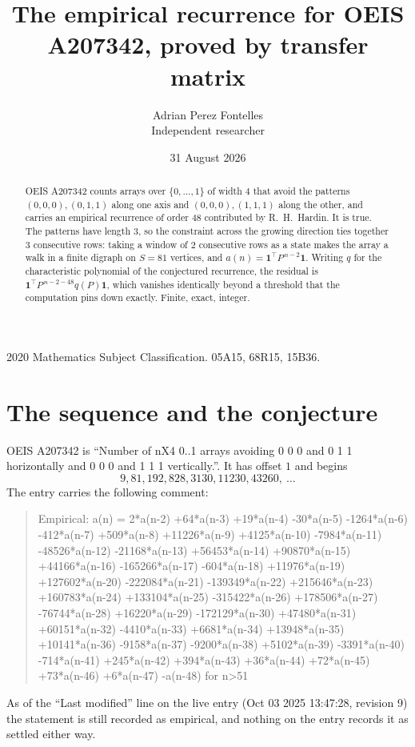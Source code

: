 \documentclass[11pt,a4paper]{article}
\title{The empirical recurrence for OEIS A207342, proved by transfer matrix}
\author{Adrian Perez Fontelles\\ \small Independent researcher}
\date{31 August 2026}
\theoremstyle{plain}
\theoremstyle{definition}
\begin{document}
\maketitle

\begin{abstract}
OEIS A207342 counts arrays over $\{0,\dots,1\}$ of width $4$ that avoid the patterns
$(0,0,0), (0,1,1)$ along one axis and $(0,0,0), (1,1,1)$ along the other, and carries an empirical recurrence of
order $48$ contributed by R.~H.~Hardin. It is true. The patterns have length $3$, so
the constraint across the growing direction ties together $3$ consecutive rows: taking a
window of $2$ consecutive rows as a state makes the array a walk in a finite digraph
on $S=81$ vertices, and $a(n)=\mathbf{1}^{\!\top}P^{\,n-2}\mathbf{1}$. Writing $q$
for the characteristic polynomial of the conjectured recurrence, the residual is
$\mathbf{1}^{\!\top}P^{\,n-2-48}q(P)\mathbf{1}$, which vanishes identically
beyond a threshold that the computation pins down exactly. Finite, exact, integer.
\end{abstract}

\noindent\small 2020 Mathematics Subject Classification. 05A15, 68R15, 15B36.\normalsize

\section{The sequence and the conjecture}

OEIS A207342 is ``Number of nX4 0..1 arrays avoiding 0 0 0 and 0 1 1 horizontally and 0 0 0 and 1 1 1 vertically.''. It has offset
$1$ and begins
\[
9, 81, 192, 828, 3130, 11230, 43260,\ \dots
\]
The entry carries the following comment:
\begin{quote}\small
Empirical: a(n) = 2*a(n-2) +64*a(n-3) +19*a(n-4) -30*a(n-5) -1264*a(n-6) -412*a(n-7) +509*a(n-8) +11226*a(n-9) +4125*a(n-10) -7984*a(n-11) -48526*a(n-12) -21168*a(n-13) +56453*a(n-14) +90870*a(n-15) +44166*a(n-16) -165266*a(n-17) -604*a(n-18) +11976*a(n-19) +127602*a(n-20) -222084*a(n-21) -139349*a(n-22) +215646*a(n-23) +160783*a(n-24) +133104*a(n-25) -315422*a(n-26) +178506*a(n-27) -76744*a(n-28) +16220*a(n-29) -172129*a(n-30) +47480*a(n-31) +60151*a(n-32) -4410*a(n-33) +6681*a(n-34) +13948*a(n-35) +10141*a(n-36) -9158*a(n-37) -9200*a(n-38) +5102*a(n-39) -3391*a(n-40) -714*a(n-41) +245*a(n-42) +394*a(n-43) +36*a(n-44) +72*a(n-45) +73*a(n-46) +6*a(n-47) -a(n-48) for n>51
\end{quote}
As of the ``Last modified'' line on the live entry (Oct 03 2025 13:47:28, revision
9) the statement is still recorded as empirical, and nothing on the entry
records it as settled either way.
\end{document}
